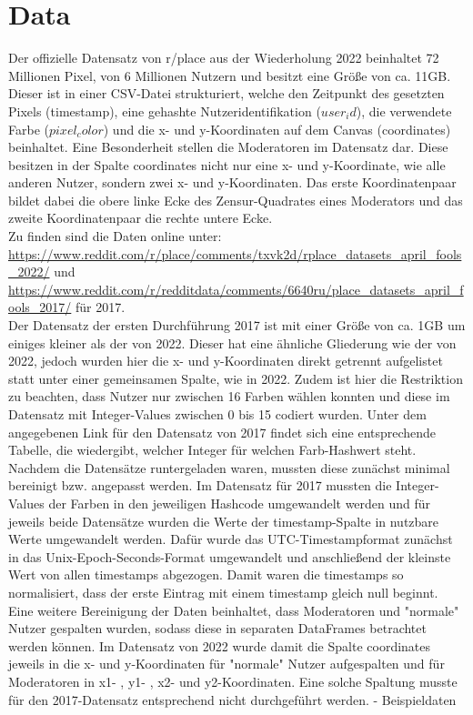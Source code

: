 \section{Data} \label{data}  %

Der offizielle Datensatz von r/place aus der Wiederholung 2022 beinhaltet 72 Millionen Pixel, von 6 Millionen Nutzern und besitzt eine Größe von ca. 11GB. 
Dieser ist in einer CSV-Datei strukturiert, welche den Zeitpunkt des gesetzten Pixels (timestamp), eine gehashte Nutzeridentifikation ($user_id$), die verwendete Farbe ($pixel_color$) und die x- und y-Koordinaten auf dem Canvas (coordinates) beinhaltet. Eine Besonderheit stellen die Moderatoren im Datensatz dar. Diese besitzen in der Spalte coordinates nicht nur eine x- und y-Koordinate, wie alle anderen Nutzer, sondern zwei x- und y-Koordinaten. Das erste Koordinatenpaar bildet dabei die obere linke Ecke des Zensur-Quadrates eines Moderators und das zweite Koordinatenpaar die rechte untere Ecke. \\
Zu finden sind die Daten online unter: \url{https://www.reddit.com/r/place/comments/txvk2d/rplace_datasets_april_fools_2022/} und \url{https://www.reddit.com/r/redditdata/comments/6640ru/place_datasets_april_fools_2017/} für 2017.\\
Der Datensatz der ersten Durchführung 2017 ist mit einer Größe von ca. 1GB um einiges kleiner als der von 2022. Dieser hat eine ähnliche Gliederung wie der von 2022, jedoch wurden hier die x- und y-Koordinaten direkt getrennt aufgelistet statt unter einer gemeinsamen Spalte, wie in 2022. Zudem ist hier die Restriktion zu beachten, dass Nutzer nur zwischen 16 Farben wählen konnten und diese im Datensatz mit Integer-Values zwischen 0 bis 15 codiert wurden. Unter dem angegebenen Link für den Datensatz von 2017 findet sich eine entsprechende Tabelle, die wiedergibt, welcher Integer für welchen Farb-Hashwert steht. \\
Nachdem die Datensätze runtergeladen waren, mussten diese zunächst minimal bereinigt bzw. angepasst werden. Im Datensatz für 2017 mussten die Integer-Values der Farben in den jeweiligen Hashcode umgewandelt werden und für jeweils beide Datensätze wurden die Werte der timestamp-Spalte in nutzbare Werte umgewandelt werden. Dafür wurde das UTC-Timestampformat zunächst in das Unix-Epoch-Seconds-Format umgewandelt und anschließend der kleinste Wert von allen timestamps abgezogen. Damit waren die timestamps so normalisiert, dass der erste Eintrag mit einem timestamp gleich null beginnt. \\
Eine weitere Bereinigung der Daten beinhaltet, dass Moderatoren und "normale" Nutzer gespalten wurden, sodass diese in separaten DataFrames betrachtet werden können. Im Datensatz von 2022 wurde damit die Spalte coordinates jeweils in die x- und y-Koordinaten für "normale" Nutzer aufgespalten und für Moderatoren in x1- , y1- , x2- und y2-Koordinaten. Eine solche Spaltung musste für den 2017-Datensatz entsprechend nicht durchgeführt werden.
-  Beispieldaten\\



